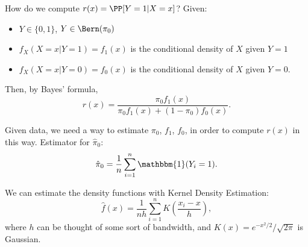 How do we compute $r(x) = \PP[Y=1|X=x]$? Given: 
\begin{itemize}
    \item $Y\in \{0,1\}$, $Y\in \Bern(\pi_0)$
    \item $f_X(X=x|Y=1) = f_1(x)$ is the conditional density of $X$ given $Y=1$
    \item $f_X(X=x|Y=0) = f_0(x)$ is the conditional density of $X$ given $Y=0$. 
\end{itemize}

Then, by Bayes' formula, 
\[r(x) = \frac{\pi_0f_1(x)}{\pi_0f_1(x)+(1-\pi_0)f_0(x)}.\]

Given data, we need a way to estimate $\pi_0$, $f_1$, $f_0$, in order to compute $r(x)$ in this way. Estimator for $\hat{\pi}_0$:
\[\hat{\pi}_0 = \frac{1}{n}\sum_{i=1}^n \mathbbm{1}(Y_i=1).\]

We can estimate the density functions with \ac{Kernel Density Estimation}:
\[\hat{f}(x) = \frac{1}{nh}\sum_{i=1}^nK\left(\frac{x_i-x}{h}\right),\]
where $h$ can be thought of some sort of bandwidth, and $K(x) = e^{-x^2/2}/\sqrt{2\pi}$ is Gaussian. 